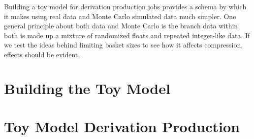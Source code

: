 Building a toy model for derivation production jobs provides a schema by which it makes using real data and Monte Carlo simulated data much simpler.
One general principle about both data and Monte Carlo is the branch data within both is made up a mixture of randomized floats and repeated integer-like data. 
If we test the ideas behind limiting basket sizes to see how it affects compression, effects should be evident. 

\section{Building the Toy Model}

\section{Toy Model Derivation Production}